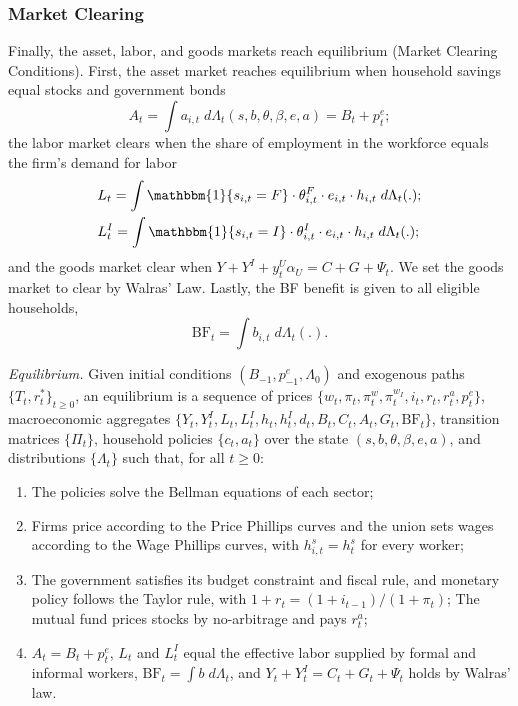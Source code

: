 \documentclass[12pt]{article}
\begin{document}
\subsubsection*{Market Clearing}
Finally, the asset, labor, and goods markets reach equilibrium (Market Clearing
Conditions). First, the asset market reaches equilibrium when household savings equal
stocks and government bonds
\[
A_t = \int a_{i,t} \; d\Lambda_t(s,b,\theta,\beta,e,a) = B_t + p_t^e;
\]
the labor market clears when the share of employment in the workforce equals the firm's
demand for labor
\begin{align*}
    &L_t = \int \mathbbm{1}\{s_{i,t}=F \} \cdot \theta^F_{i,t} \cdot
            e_{i,t} \cdot h_{i,t} \; d\Lambda_t(.); \\
    &L_t^I = \int \mathbbm{1}\{s_{i,t}=I \} \cdot \theta^I_{i,t} \cdot
            e_{i,t} \cdot h_{i,t} \; d\Lambda_t(.);
\end{align*}
and the goods market clear when $Y + Y^I + y_t^U \alpha_U = C + G + \Psi_t$. We set the
goods market to clear by Walras' Law. Lastly, the BF benefit is given to all eligible
households,
\[
\text{BF}_t = \int b_{i,t} \; d\Lambda_t(.).
\]

\textit{Equilibrium.} Given initial conditions $(B_{-1}, p_{-1}^e, \Lambda_0)$ and
exogenous paths $\{T_t, r^*_t\}_{t\geq0}$, an equilibrium is a sequence of prices
$\{w_t, \pi_t, \pi^w_t, \pi_t^{w_I}, i_t, r_t, r^a_t, p^e_t\}$, macroeconomic
aggregates
$\{Y_t, Y^I_t, L_t, L^I_t, h_t, h_t^I, d_t, B_t, C_t, A_t, G_t, \text{BF}_t\}$,
transition matrices $\{\Pi_t\}$, household policies $\{c_t, a_t\}$ over the state
$(s, b, \theta, \beta, e, a)$, and distributions $\{\Lambda_t\}$ such that, for all
$t\geq0$:
\begin{enumerate}
    \item The policies solve the Bellman equations of each sector;
    \item Firms price according to the Price Phillips curves and the union sets wages
    according to the Wage Phillips curves, with $h_{i,t}^s = h_t^s$ for every worker;
    \item The government satisfies its budget constraint and fiscal rule, and monetary
    policy follows the Taylor rule, with $1+r_t = (1+i_{t-1})/(1+\pi_t)$; The mutual
    fund prices stocks by no-arbitrage and pays $r^a_t$;
    \item $A_t = B_t + p^e_t$, $L_t$ and $L^I_t$ equal the effective labor
    supplied by formal and informal workers, $\text{BF}_t = \int b \; d\Lambda_t$, and
    $Y_t + Y^I_t = C_t + G_t + \Psi_t$ holds by Walras' law.
\end{enumerate}
\end{document}

